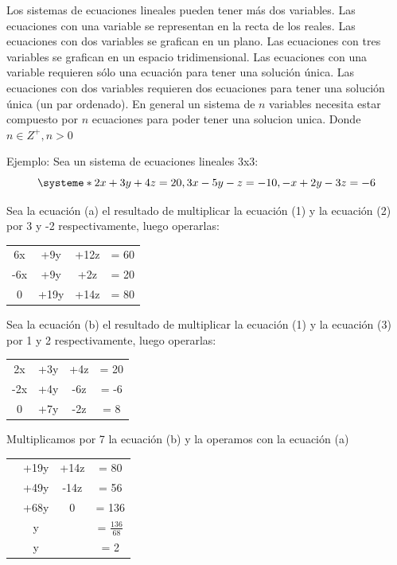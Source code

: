 \documentclass[a4paper, apacite, 12pt, doc]{apa6}
\begin{document}
Los sistemas de ecuaciones lineales pueden tener más  dos variables. Las ecuaciones con una variable se representan en la recta de los reales. Las ecuaciones con dos variables se grafican en un plano. Las ecuaciones con tres variables se grafican en un espacio tridimensional. Las ecuaciones con una variable requieren sólo una ecuación para tener una solución única. Las ecuaciones con dos variables requieren dos ecuaciones para tener una solución única (un par ordenado). En general un sistema de $n$ variables necesita estar compuesto por $n$ ecuaciones para poder tener una solucion unica. Donde $n \in Z^+, n > 0$

Ejemplo: Sea un sistema de ecuaciones lineales 3x3:
\[
\systeme*{2x+3y+4z=20, 3x-5y-z= -10, -x+2y-3z =-6}
\]

Sea la ecuación (a) el resultado de multiplicar la ecuación (1) y la ecuación (2) por 3 y -2 respectivamente, luego operarlas:

\begin{center}
	\begin{tabular}{cccc}
		6x &+9y & +12z  & = 60 \\
		-6x &+9y & +2z  & = 20 \\
		\hline
		 0 & +19y & +14z & = 80
	\end{tabular}
\end{center}

Sea la ecuación (b) el resultado de multiplicar la ecuación (1) y la ecuación (3) por 1 y 2 respectivamente, luego operarlas:

\begin{center}
	\begin{tabular}{cccc}
		2x &+3y & +4z  & = 20 \\
		-2x &+4y & -6z  & = -6 \\
		\hline
		 0 & +7y & -2z & = 8
	\end{tabular}
\end{center}

Multiplicamos por 7 la ecuación (b) y la operamos con la ecuación (a)

\begin{center}
	\begin{tabular}{cccc}
		 & +19y & +14z & = 80 \\
		 & +49y & -14z & = 56 \\
		\hline
		&  +68y& 0  & = 136 \\
		&    y  &   & = $\frac{136}{68}$ \\
		&    y & &   = 2
	\end{tabular}
\end{center}
\end{document}

